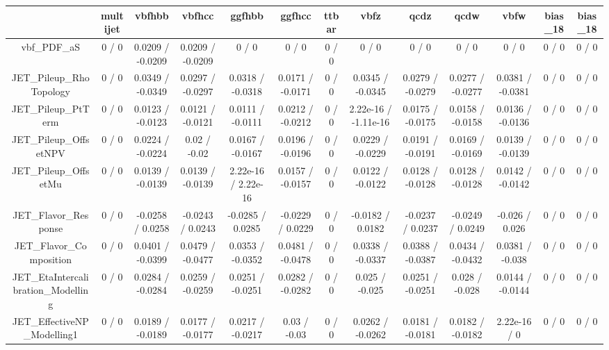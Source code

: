 \documentclass[10pt]{article}
\begin{document}
\begin{table}[htbp]
\begin{center}
\begin{tabular}{|c|c|c|c|c|c|c|c|c|c|c|c|c|}
\hline 
      & multijet      & vbfhbb      & vbfhcc      & ggfhbb      & ggfhcc      & ttbar      & vbfz      & qcdz      & qcdw      & vbfw      & bias_18      & bias_18 \\ 
\hline 
  vbf_PDF_aS & 0 / 0 & 0.0209 / -0.0209 & 0.0209 / -0.0209 & 0 / 0 & 0 / 0 & 0 / 0 & 0 / 0 & 0 / 0 & 0 / 0 & 0 / 0 & 0 / 0 & 0 / 0 \\ 
  JET_Pileup_RhoTopology & 0 / 0 & 0.0349 / -0.0349 & 0.0297 / -0.0297 & 0.0318 / -0.0318 & 0.0171 / -0.0171 & 0 / 0 & 0.0345 / -0.0345 & 0.0279 / -0.0279 & 0.0277 / -0.0277 & 0.0381 / -0.0381 & 0 / 0 & 0 / 0 \\ 
  JET_Pileup_PtTerm & 0 / 0 & 0.0123 / -0.0123 & 0.0121 / -0.0121 & 0.0111 / -0.0111 & 0.0212 / -0.0212 & 0 / 0 & 2.22e-16 / -1.11e-16 & 0.0175 / -0.0175 & 0.0158 / -0.0158 & 0.0136 / -0.0136 & 0 / 0 & 0 / 0 \\ 
  JET_Pileup_OffsetNPV & 0 / 0 & 0.0224 / -0.0224 & 0.02 / -0.02 & 0.0167 / -0.0167 & 0.0196 / -0.0196 & 0 / 0 & 0.0229 / -0.0229 & 0.0191 / -0.0191 & 0.0169 / -0.0169 & 0.0139 / -0.0139 & 0 / 0 & 0 / 0 \\ 
  JET_Pileup_OffsetMu & 0 / 0 & 0.0139 / -0.0139 & 0.0139 / -0.0139 & 2.22e-16 / 2.22e-16 & 0.0157 / -0.0157 & 0 / 0 & 0.0122 / -0.0122 & 0.0128 / -0.0128 & 0.0128 / -0.0128 & 0.0142 / -0.0142 & 0 / 0 & 0 / 0 \\ 
  JET_Flavor_Response & 0 / 0 & -0.0258 / 0.0258 & -0.0243 / 0.0243 & -0.0285 / 0.0285 & -0.0229 / 0.0229 & 0 / 0 & -0.0182 / 0.0182 & -0.0237 / 0.0237 & -0.0249 / 0.0249 & -0.026 / 0.026 & 0 / 0 & 0 / 0 \\ 
  JET_Flavor_Composition & 0 / 0 & 0.0401 / -0.0399 & 0.0479 / -0.0477 & 0.0353 / -0.0352 & 0.0481 / -0.0478 & 0 / 0 & 0.0338 / -0.0337 & 0.0388 / -0.0387 & 0.0434 / -0.0432 & 0.0381 / -0.038 & 0 / 0 & 0 / 0 \\ 
  JET_EtaIntercalibration_Modelling & 0 / 0 & 0.0284 / -0.0284 & 0.0259 / -0.0259 & 0.0251 / -0.0251 & 0.0282 / -0.0282 & 0 / 0 & 0.025 / -0.025 & 0.0251 / -0.0251 & 0.028 / -0.028 & 0.0144 / -0.0144 & 0 / 0 & 0 / 0 \\ 
  JET_EffectiveNP_Modelling1 & 0 / 0 & 0.0189 / -0.0189 & 0.0177 / -0.0177 & 0.0217 / -0.0217 & 0.03 / -0.03 & 0 / 0 & 0.0262 / -0.0262 & 0.0181 / -0.0181 & 0.0182 / -0.0182 & 2.22e-16 / 0 & 0 / 0 & 0 / 0 \\ 

\end{tabular}
\end{center}
\end{table}
\end{document}
